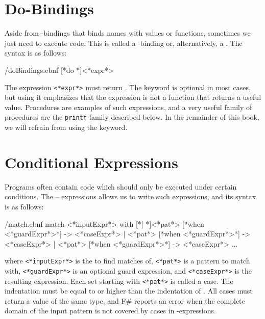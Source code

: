 \documentclass[fsharpNotes.tex]{subfiles}
\begin{document}

\section{Do-Bindings}
Aside from -bindings that binds names with values or functions, sometimes we just need to execute code. This is called a -binding or, alternatively, a . The syntax is as follows:
%
\begin{verbatimwrite}{\ebnf/doBindings.ebnf}
[*do *]<*expr*>
\end{verbatimwrite}
%
The expression \lstinline[language=syntax]{<*expr*>} must return . The keyword  is optional in most cases, but using it emphasizes that the expression is not a function that returns a useful value. Procedures are examples of such expressions, and a very useful family of procedures are the \lstinline{printf} family described below. In the remainder of this book, we will refrain from using the  keyword.

\section{Conditional Expressions}
Programs often contain code which should only be executed under certain conditions. The  --  expressions allows us to write such expressions, and its syntax is as follows:
%
\begin{verbatimwrite}{\ebnf/match.ebnf}
match <*inputExpr*> with 
 [*| *]<*pat*> [*when <*guardExpr*>*] -> <*caseExpr*> 
 | <*pat*> [*when <*guardExpr*>*] -> <*caseExpr*> 
 | <*pat*> [*when <*guardExpr*>*] -> <*caseExpr*> 
 ...
\end{verbatimwrite}
%
where \lstinline[language=syntax]{<*inputExpr*>} is the  to find matches of, \lstinline[language=syntax]{<*pat*>} is a pattern to match with, \lstinline[language=syntax]{<*guardExpr*>} is an optional guard expression, and \lstinline[language=syntax]{<*caseExpr*>} is the resulting expression. Each set starting with \lstinline[language=syntax]{<*pat*>} is called a case.  The indentation must be equal to or higher than the indentation of . All cases must return a value of the same type, and F\# reports an error when the complete domain of the input pattern is not covered by cases in -expressions.
\end{document}
